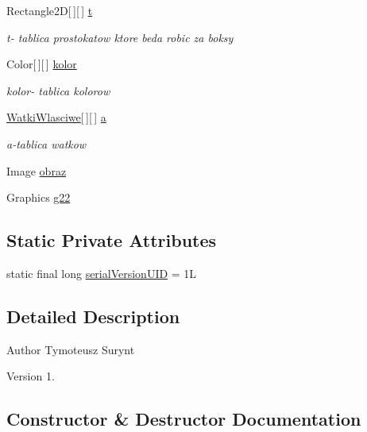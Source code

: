 \begin{DoxyCompactItemize}
Rectangle2D\mbox{[}$\,$\mbox{]}\mbox{[}$\,$\mbox{]} \hyperlink{class_zadanie7_1_1_okno_wlasciwe_a76e7cdaa5f7d262c3466f9e28126a1a4}{t}
\begin{DoxyCompactList}\small\item\em t-\/ tablica prostokatow ktore beda robic za boksy \end{DoxyCompactList}\item 
Color\mbox{[}$\,$\mbox{]}\mbox{[}$\,$\mbox{]} \hyperlink{class_zadanie7_1_1_okno_wlasciwe_a6adcf3f4cbee43c70583647ed34b9db4}{kolor}
\begin{DoxyCompactList}\small\item\em kolor-\/ tablica kolorow \end{DoxyCompactList}\item 
\hyperlink{class_zadanie7_1_1_okno_wlasciwe_1_1_watki_wlasciwe}{Watki\+Wlasciwe}\mbox{[}$\,$\mbox{]}\mbox{[}$\,$\mbox{]} \hyperlink{class_zadanie7_1_1_okno_wlasciwe_ac767c1f94c8102a043d4cd4f85eb99ba}{a}
\begin{DoxyCompactList}\small\item\em a-\/tablica watkow \end{DoxyCompactList}\item 
Image \hyperlink{class_zadanie7_1_1_okno_wlasciwe_acb927a7852ab3d56d14b896ccbac3446}{obraz}
\item 
Graphics \hyperlink{class_zadanie7_1_1_okno_wlasciwe_ae40d1f4b0ba77778e9aff178a22d8caf}{g22}
\end{DoxyCompactItemize}
\subsection*{Static Private Attributes}
\begin{DoxyCompactItemize}
\item 
static final long \hyperlink{class_zadanie7_1_1_okno_wlasciwe_ad82a67e6a62aab90682d92db18f794d1}{serial\+Version\+U\+ID} = 1L
\end{DoxyCompactItemize}


\subsection{Detailed Description}
\begin{DoxyAuthor}{Author}
Tymoteusz Surynt 
\end{DoxyAuthor}
\begin{DoxyVersion}{Version}
1. 
\end{DoxyVersion}


\subsection{Constructor \& Destructor Documentation}
